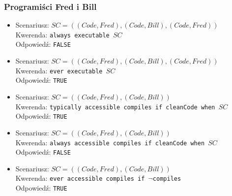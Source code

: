 \documentclass{article}
\begin{document}
\subsubsection{Programiści Fred i Bill}
\begin{itemize}
\item
Scenariusz: $SC=((Code,Fred),(Code,Bill),(Code,Fred))$\\
Kwerenda: {\large\texttt{always executable $SC$}}\\
Odpowiedź: \texttt{FALSE}
\item
Scenariusz: $SC=((Code,Fred),(Code,Bill),(Code,Fred))$\\
Kwerenda: {\large\texttt{ever executable $SC$}}\\
Odpowiedź: \texttt{TRUE}
\item
Scenariusz: $SC=((Code,Fred),(Code,Bill))$\\
Kwerenda: {\large\texttt{typically accessible compiles if cleanCode when $SC$}}\\
Odpowiedź: \texttt{TRUE}
\item
Scenariusz: $SC=((Code,Fred),(Code,Bill))$\\
Kwerenda: {\large\texttt{always accessible compiles if cleanCode when $SC$}}\\
Odpowiedź: \texttt{FALSE}
\item
Scenariusz: $SC=((Code,Fred),(Code,Bill))$\\
Kwerenda: {\large\texttt{ever accessible compiles if $\neg$compiles}}\\
Odpowiedź: \texttt{TRUE}
\end{itemize}
\end{document}

